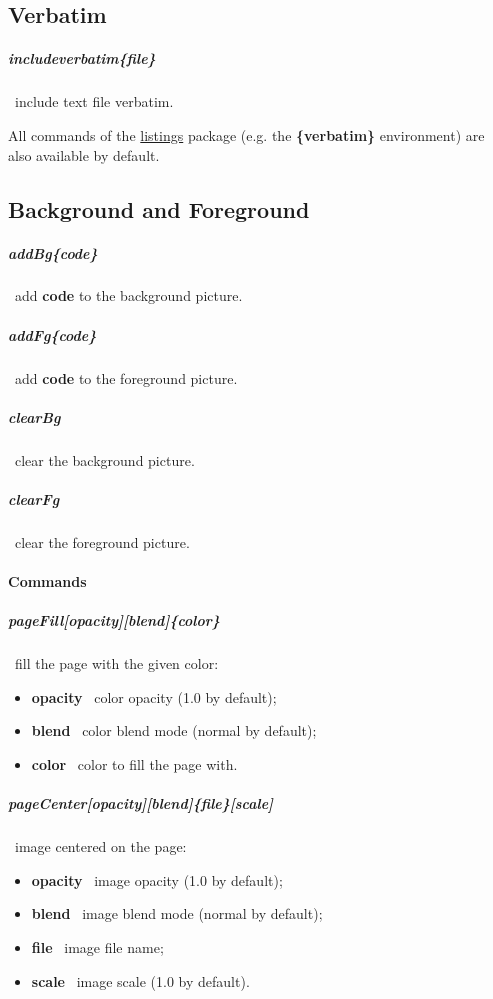 \documentclass[english,12pt,openany,letterpaper]{book}
\begin{document}
\linefill

\subsection{Verbatim}

\subparagraph{\bs includeverbatim\{file\}} \dash\ include text file verbatim.

\skipline

All commands of the \href{https://www.ctan.org/pkg/listings}{listings} package (e.g. the \textbf{\{verbatim\}} environment) are also available by default.

\vfill
\cleartorightpage

\subsection{Background and Foreground}

\subparagraph{\bs addBg\{code\}} \dash\ add \textbf{code} to the background picture.

\subparagraph{\bs addFg\{code\}} \dash\ add \textbf{code} to the foreground picture.

\subparagraph{\bs clearBg} \dash\ clear the background picture.

\subparagraph{\bs clearFg} \dash\ clear the foreground picture.

\skipline

\paragraph{Commands}

\subparagraph{\bs pageFill[opacity][blend]\{color\}} \dash\ fill the page with the given color:
\begin{itemize}
	\item \textbf{opacity} \dash\ color opacity (1.0 by default);
	\item \textbf{blend} \dash\ color blend mode (normal by default);
	\item \textbf{color} \dash\ color to fill the page with.
\end{itemize}

\subparagraph{\bs pageCenter[opacity][blend]\{file\}[scale]} \dash\ image centered on the page:
\begin{itemize}
	\item \textbf{opacity} \dash\ image opacity (1.0 by default);
	\item \textbf{blend} \dash\ image blend mode (normal by default);
	\item \textbf{file} \dash\ image file name;
	\item \textbf{scale} \dash\ image scale (1.0 by default).
\end{itemize}
\end{document}
